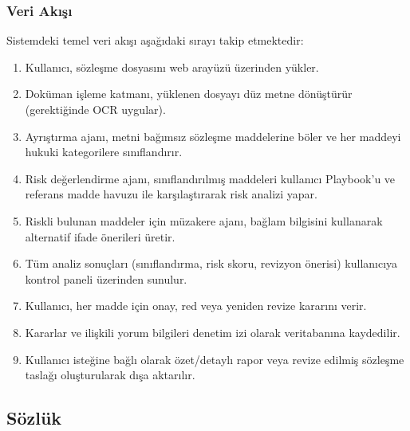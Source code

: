\documentclass[12pt, a4paper]{article}
\begin{document}
\subsubsection{Veri Akışı}
Sistemdeki temel veri akışı aşağıdaki sırayı takip etmektedir:

\begin{enumerate}[leftmargin=2cm]
    \item Kullanıcı, sözleşme dosyasını web arayüzü üzerinden yükler.
    \item Doküman işleme katmanı, yüklenen dosyayı düz metne dönüştürür (gerektiğinde OCR uygular).
    \item Ayrıştırma ajanı, metni bağımsız sözleşme maddelerine böler ve her maddeyi hukuki kategorilere sınıflandırır.
    \item Risk değerlendirme ajanı, sınıflandırılmış maddeleri kullanıcı Playbook'u ve referans madde havuzu ile karşılaştırarak risk analizi yapar.
    \item Riskli bulunan maddeler için müzakere ajanı, bağlam bilgisini kullanarak alternatif ifade önerileri üretir.
    \item Tüm analiz sonuçları (sınıflandırma, risk skoru, revizyon önerisi) kullanıcıya kontrol paneli üzerinden sunulur.
    \item Kullanıcı, her madde için onay, red veya yeniden revize kararını verir.
    \item Kararlar ve ilişkili yorum bilgileri denetim izi olarak veritabanına kaydedilir.
    \item Kullanıcı isteğine bağlı olarak özet/detaylı rapor veya revize edilmiş sözleşme taslağı oluşturularak dışa aktarılır.
\end{enumerate}


\subsection{Sözlük}
\end{document}
